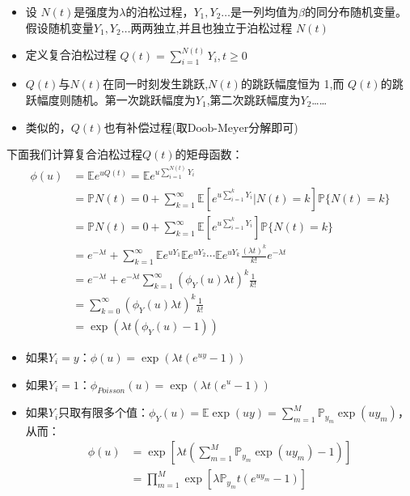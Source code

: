 \documentclass[a4paper, 12pt]{ctexart}
\begin{document}
\begin{itemize}
    \item 设 $N(t)$是强度为$\lambda$的泊松过程，$Y_1 ,Y_2 \dots$是一列均值为$\beta$的同分布随机变量。假设随机变量$Y_1 ,Y_2 \dots$两两独立,并且也独立于泊松过程 $N(t)$ 
    \item 定义复合泊松过程  $Q(t)=\sum_{i=1}^{N(t)}Y_i,t \geqslant 0$ 
    \item $Q(t)$与$N(t)$在同一时刻发生跳跃,$N(t)$的跳跃幅度恒为 1,而 $Q(t)$的跳跃幅度则随机。第一次跳跃幅度为$Y_1$,第二次跳跃幅度为$Y_2$……
    \item 类似的，$Q(t)$也有补偿过程(取$\text{Doob-Meyer}$分解即可)
\end{itemize}

下面我们计算复合泊松过程$Q(t)$的矩母函数：
\begin{align*}
    \phi(u) &= \mathbb{E}e^{uQ(t)} = \mathbb{E}e^{u\sum_{i=1}^{N(t)}Y_i} \\ 
    &= \mathbb{P}{N(t) = 0} + \sum_{k=1}^{\infty} \mathbb{E}\left[e^{u\sum_{i=1}^k Y_i} \Big| N(t) = k\right]\mathbb{P}\{N(t) = k\} \\ 
    &= \mathbb{P}{N(t) = 0} + \sum_{k=1}^{\infty} \mathbb{E}\left[e^{u\sum_{i=1}^k Y_i}\right]\mathbb{P}\{N(t) = k\} \\ 
    &= e^{-\lambda t} + \sum_{k=1}^{\infty} \mathbb{E}e^{uY_1} \mathbb{E}e^{uY_2} \cdots \mathbb{E}e^{uY_k} \frac{(\lambda t)^k}{k!} e^{-\lambda t} \\ 
    &= e^{-\lambda t} + e^{-\lambda t} \sum_{k=1}^{\infty} \left(\phi_Y(u)\lambda t\right)^k \frac{1}{k!} \\
    & = \sum_{k=0}^{\infty} \left(\phi_Y(u)\lambda t\right)^k \frac{1}{k!} \\
    & = \exp \left(\lambda t (\phi_{Y}(u)-1)\right)
\end{align*}

\begin{itemize}
    \item 如果$Y_{i}=y$：$\phi(u)=\exp(\lambda t(e^{  uy}-1))$
    \item 如果$Y_{i}=1$：$\phi_{Poisson}(u)=\exp(\lambda t(e^{  u}-1))$
    \item 如果$Y_{i}$只取有限多个值：$\phi_{Y}(u)=\mathbb{E}\exp(uy)=\sum_{m=1}^M \mathbb{P}_{y_{m}} \exp(uy_{m})$，
          从而：
            \begin{align*}
                \phi(u)&=\exp \left[ \lambda t\left( \sum_{m=1}^M \mathbb{P}_{y_{m}} \exp(uy_{m})-1 \right) \right] \\
                &=\prod_{m=1}^M  \exp[\lambda \mathbb{P}_{y_{m}}t(e^{uy_{m}}-1)] 
            \end{align*}
\end{itemize}
\end{document}

